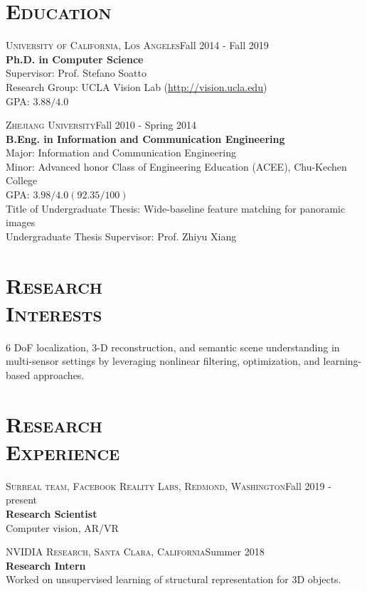\documentclass[margin, line, 10pt]{res} %
\begin{document}
\begin{resume}

\section{\textsc{Education}}
\textsc{University of California, Los Angeles}\hfill{Fall 2014 - Fall 2019}\\
{\bf Ph.D. in Computer Science}\\
Supervisor: Prof. Stefano Soatto\\
Research Group: UCLA Vision Lab (\url{http://vision.ucla.edu})\\
GPA: $3.88/4.0$

\textsc{Zhejiang University}\hfill{Fall 2010 - Spring 2014}\\
{\bf B.Eng. in Information and Communication Engineering}\\
Major: Information and Communication Engineering\\
Minor: Advanced honor Class of Engineering Education (ACEE), Chu-Kechen College\\
GPA: $3.98/4.0 (92.35/100)$\\
Title of Undergraduate Thesis: Wide-baseline feature matching for panoramic images\\
Undergraduate Thesis Supervisor: Prof. Zhiyu Xiang

\section{\textsc{Research\\Interests}}
6 DoF localization, 3-D reconstruction, and semantic scene understanding in multi-sensor settings by leveraging nonlinear filtering, optimization, and learning-based approaches.


\section{\textsc{Research\\Experience}}

\textsc{Surreal team, Facebook Reality Labs, Redmond, Washington}\hfill Fall 2019 - present \\
\textbf{Research Scientist}\\
Computer vision, AR/VR

\textsc{NVIDIA Research, Santa Clara, California}\hfill Summer 2018\\
\textbf{Research Intern}\\
Worked on unsupervised learning of structural representation for 3D objects.


\end{resume}
\end{document}
